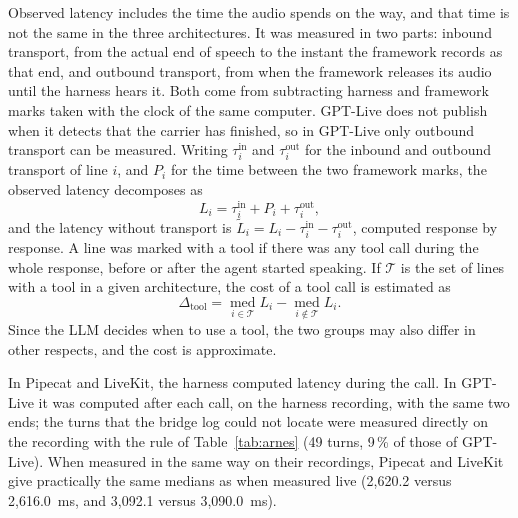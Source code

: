 \documentclass[11pt]{article}
\newcommand{\RReconMedA}{2{,}620.2}
\newcommand{\RReconMedB}{3{,}092.1}
\newcommand{\RReconObsMedA}{2{,}616.0}
\newcommand{\RReconObsMedB}{3{,}090.0}
\newcommand{\RRecuperadosC}{49}
\newcommand{\RRecuperadosPctC}{9}
\begin{document}
Observed latency includes the time the audio spends on the way, and that time is not
the same in the three architectures. It was measured in two parts: inbound transport,
from the actual end of speech to the instant the framework records as that end, and
outbound transport, from when the framework releases its audio until the
harness hears it. Both come from subtracting harness and framework marks taken with
the clock of the same computer. GPT-Live does not publish when it detects that the
carrier has finished, so in GPT-Live only outbound transport can be measured.
Writing $\tau^{\text{in}}_i$ and $\tau^{\text{out}}_i$ for the inbound and outbound transport of line $i$, and $P_i$ for the time between the two framework marks, the observed latency decomposes as
\begin{equation}
L_i=\tau^{\text{in}}_i+P_i+\tau^{\text{out}}_i ,
\label{eq:transporte}
\end{equation}
and the latency without transport is $\tilde{L}_i=L_i-\tau^{\text{in}}_i-\tau^{\text{out}}_i$, computed response by response. A line was marked with a tool if there was any tool call during the whole response,
before or after the agent started speaking. If $\mathcal{T}$ is the set of lines with a tool in a given architecture, the cost of a tool call is estimated as
\begin{equation}
\Delta_{\text{tool}}=\operatorname*{med}_{i\in\mathcal{T}}L_i-\operatorname*{med}_{i\notin\mathcal{T}}L_i .
\label{eq:herramienta}
\end{equation}
Since the LLM decides
when to use a tool, the two groups may also differ in other respects, and the cost is
approximate.

In Pipecat and LiveKit, the harness computed latency during the call. In GPT-Live it was
computed after each call, on the harness recording, with the same two ends; the turns
that the bridge log could not locate were measured directly on the recording with the
rule of Table~\ref{tab:arnes} (\RRecuperadosC{} turns, \RRecuperadosPctC\,\% of those
of GPT-Live). When measured in the same way on their recordings, Pipecat and LiveKit give practically the same
medians as when measured live (\RReconMedA{} versus \RReconObsMedA~ms, and \RReconMedB{} versus
\RReconObsMedB~ms).
\end{document}
